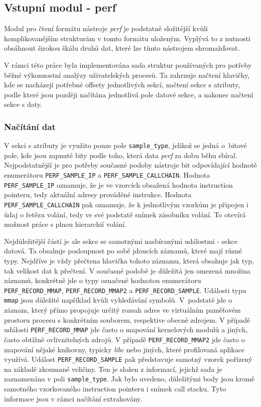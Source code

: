 \documentclass[czech,BP]{thesiskiv}
\begin{document}
\subsection{Vstupní modul - perf}

Modul pro čtení formátu nástroje \emph{perf} je podstatně složitější kvůli komplikovanějším strukturám v tomto formátu uloženým. Vyplývá to z nutnosti obsáhnout širokou škálu druhů dat, které lze tímto nástrojem shromažďovat.

V rámci této práce byla implementována sada struktur používaných pro potřeby běžné výkonnostní analýzy uživatelských procesů. Ta zahrnuje načtení hlavičky, kde se nacházejí potřebné offsety jednotlivých sekcí, načtení sekce s atributy, podle které jsou později načítána jednotlivá pole datové sekce, a nakonec načtení sekce s daty.

\subsubsection*{Načítání dat}

V sekci s atributy je využito pouze pole \texttt{sample\_type}, jelikož se jedná o~bitové pole, kde jsou zapnuté bity podle toho, která data \emph{perf} za dobu běhu sbíral. Nejpodstatnější je pro potřeby současné podoby nástroje bit odpovídající hodnotě enumerátoru \texttt{PERF\_SAMPLE\_IP} a \texttt{PERF\_SAMPLE\_CALLCHAIN}. Hodnota \texttt{PERF\_SAMPLE\_IP} oznamuje, že je ve vzorcích obsažená hodnota instruction pointeru, tedy aktuální adresy prováděné instrukce. Hodnota \texttt{PERF\_SAMPLE\_CALLCHAIN} pak oznamuje, že k jednotlivým vzorkům je připojen i údaj o řetězu volání, tedy ve své podstatě snímek zásobníku volání. To otevírá možnost práce s plnou hierarchií volání.

Nejdůležitější částí je ale sekce se samotnými nasbíranými událostmi - sekce datová. Ta obsahuje posloupnost po sobě jdoucích záznamů, které mají různé typy. Nejdříve je vždy přečtena hlavička tohoto záznamu, která obsahuje jak typ, tak velikost dat k přečtení. V současné podobě je důležitá jen omezená množina záznamů, konkrétně jde o typy označené hodnotou enumerátoru \texttt{PERF\_RECORD\_MMAP}, \texttt{PERF\_RECORD\_MMAP2} a \texttt{PERF\_RECORD\_SAMPLE}. Události typu \texttt{mmap} jsou důležité například kvůli vyhledávání symbolů. V~podstatě jde o záznam, který přímo propojuje určitý rozsah adres ve virtuálním paměťovém prostoru procesu s konkrétním souborem, respektive obecně zdrojem. V případě události \texttt{PERF\_RECORD\_MMAP} jde často o mapování kernelových modulů a jiných, často obtížně ovlivnitelných zdrojů. V případě \texttt{PERF\_RECORD\_MMAP2} jde často o mapování nějaké knihovny, typicky \emph{libc} nebo jiných, které profilovaná aplikace využívá. Událost \texttt{PERF\_RECORD\_SAMPLE} pak představuje samotný vzorek pořízený na základě zkoumané veličiny. Ten je složen z informací, jejichž sada je zaznamenána v poli \texttt{sample\_type}. Jak bylo uvedeno, důležitými body jsou kromě samotného vzorkovaného instruction pointeru i snímek call stacku. Tyto informace jsou v rámci načítání extrahovány.
\end{document}
